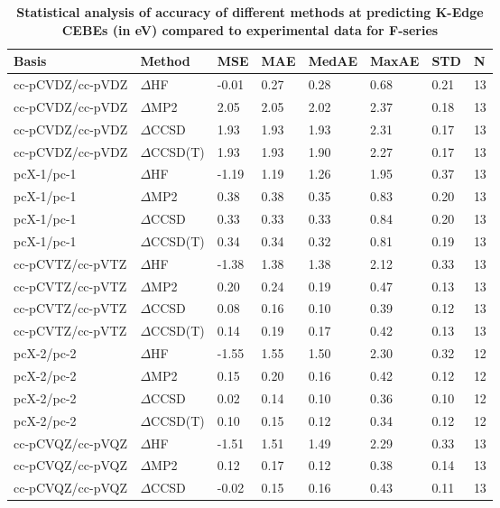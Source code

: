 \begin{table}
  \caption{\textbf{Statistical analysis of accuracy of different methods at predicting K-Edge CEBEs (in eV) compared to experimental data for F-series}}
  \begin{tabular}{l l l l l l l l }
    \toprule
    \textbf{Basis} & \textbf{Method} & \textbf{MSE} & \textbf{MAE} & \textbf{MedAE} & \textbf{MaxAE} & \textbf{STD} & \textbf{N} \\ 
    \midrule
    cc-pCVDZ/cc-pVDZ & $\Delta$HF & -0.01 & 0.27 & 0.28 & 0.68 & 0.21 & 13 \\ 
    cc-pCVDZ/cc-pVDZ & $\Delta$MP2 & 2.05 & 2.05 & 2.02 & 2.37 & 0.18 & 13 \\ 
    cc-pCVDZ/cc-pVDZ & $\Delta$CCSD & 1.93 & 1.93 & 1.93 & 2.31 & 0.17 & 13 \\ 
    cc-pCVDZ/cc-pVDZ & $\Delta$CCSD(T) & 1.93 & 1.93 & 1.90 & 2.27 & 0.17 & 13 \\ 
    pcX-1/pc-1 & $\Delta$HF & -1.19 & 1.19 & 1.26 & 1.95 & 0.37 & 13 \\ 
    pcX-1/pc-1 & $\Delta$MP2 & 0.38 & 0.38 & 0.35 & 0.83 & 0.20 & 13 \\ 
    pcX-1/pc-1 & $\Delta$CCSD & 0.33 & 0.33 & 0.33 & 0.84 & 0.20 & 13 \\ 
    pcX-1/pc-1 & $\Delta$CCSD(T) & 0.34 & 0.34 & 0.32 & 0.81 & 0.19 & 13 \\ 
    cc-pCVTZ/cc-pVTZ & $\Delta$HF & -1.38 & 1.38 & 1.38 & 2.12 & 0.33 & 13 \\ 
    cc-pCVTZ/cc-pVTZ & $\Delta$MP2 & 0.20 & 0.24 & 0.19 & 0.47 & 0.13 & 13 \\ 
    cc-pCVTZ/cc-pVTZ & $\Delta$CCSD & 0.08 & 0.16 & 0.10 & 0.39 & 0.12 & 13 \\ 
    cc-pCVTZ/cc-pVTZ & $\Delta$CCSD(T) & 0.14 & 0.19 & 0.17 & 0.42 & 0.13 & 13 \\ 
    pcX-2/pc-2 & $\Delta$HF & -1.55 & 1.55 & 1.50 & 2.30 & 0.32 & 12 \\ 
    pcX-2/pc-2 & $\Delta$MP2 & 0.15 & 0.20 & 0.16 & 0.42 & 0.12 & 12 \\ 
    pcX-2/pc-2 & $\Delta$CCSD & 0.02 & 0.14 & 0.10 & 0.36 & 0.10 & 12 \\ 
    pcX-2/pc-2 & $\Delta$CCSD(T) & 0.10 & 0.15 & 0.12 & 0.34 & 0.12 & 12 \\ 
    cc-pCVQZ/cc-pVQZ & $\Delta$HF & -1.51 & 1.51 & 1.49 & 2.29 & 0.33 & 13 \\ 
    cc-pCVQZ/cc-pVQZ & $\Delta$MP2 & 0.12 & 0.17 & 0.12 & 0.38 & 0.14 & 13 \\ 
    cc-pCVQZ/cc-pVQZ & $\Delta$CCSD & -0.02 & 0.15 & 0.16 & 0.43 & 0.11 & 13 \\ 

\end{tabular}
\end{table}
